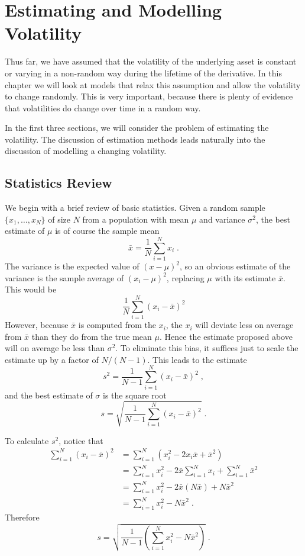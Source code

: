\chapter{Estimating and Modelling Volatility}\label{c_stochasticvolatility}

Thus far, we have assumed that the volatility of the underlying asset is constant or varying in a non-random way during the lifetime of the derivative.  In this chapter we will look at models that relax this assumption and allow the volatility to change randomly.  This is very important, because there is plenty of evidence that volatilities do change over time in a random way.  

In the first three sections, we will consider the problem of estimating the volatility.  The discussion of estimation methods leads naturally into the discussion of modelling a changing volatility.  

\section{Statistics Review}\label{s_statistics}

We begin with a brief review of basic statistics.
Given a random sample $\{x_1,\ldots,x_N\}$ of size $N$ from a population with mean $\mu$ and variance $\sigma^2$, the best estimate of $\mu$ is of course the sample mean 
$$\bar{x} = \frac{1}{N}\sum_{i=1}^{N}x_i\; .$$
The variance is the expected value of $(x-\mu)^2$, so an obvious estimate of the variance is the sample average of $(x_i-\mu)^2$, replacing $\mu$ with its estimate $\bar{x}$.  This would be
$$\frac{1}{N}\sum_{i=1}^{N} (x_i-\bar{x})^2$$
However, because $\bar{x}$ is computed from the $x_i$, the $x_i$ will deviate less on average from $\bar{x}$ than they do from the true mean $\mu$.  Hence the estimate proposed above will on average be less than $\sigma^2$.  To eliminate this bias, it suffices just to scale the estimate up by a factor of $N/(N-1)$.  This leads to the estimate
$$s^2=\frac{1}{N-1}\sum_{i=1}^{N} (x_i-\bar{x})^2\; ,$$
and the best estimate of $\sigma$ is the square root
$$s=\sqrt{\frac{1}{N-1}\sum_{i=1}^{N} (x_i-\bar{x})^2}\; .$$

To calculate $s^2$, notice that 
\begin{align*}
\sum_{i=1}^{N} (x_i-\bar{x})^2 &= \sum_{i=1}^{N} (x_i^2-2x_i\bar{x}+\bar{x}^2)\\
&=\sum_{i=1}^{N} x_i^2 -2\bar{x}\sum_{i=1}^{N} x_i + \sum_{i=1}^N \bar{x}^2\\
&=\sum_{i=1}^{N} x_i^2 -2\bar{x}(N\bar{x})+N\bar{x}^2\\
&=\sum_{i=1}^{N} x_i^2 -N\bar{x}^2\;.
\end{align*}
Therefore
$$s=\sqrt{\frac{1}{N-1}\left(\sum_{i=1}^{N} x_i^2-N\bar{x}^2\right)}\; .$$


